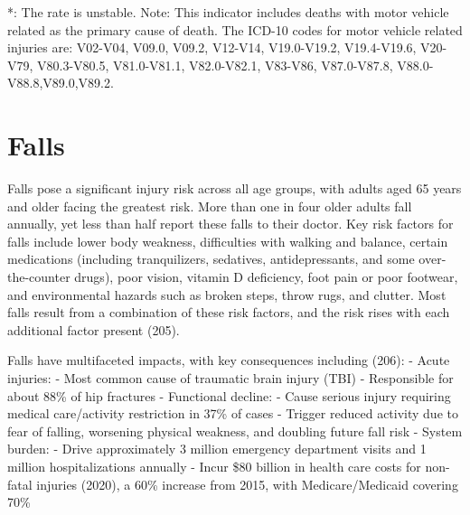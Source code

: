 \documentclass[
  english,
  letterpaper,
]{report}
\begin{document}
\begin{tcolorbox}[enhanced jigsaw, breakable, leftrule=.75mm, title=\textcolor{quarto-callout-note-color}{\faInfo}\hspace{0.5em}{Note}, bottomrule=.15mm, opacityback=0, left=2mm, colback=white, bottomtitle=1mm, coltitle=black, colbacktitle=quarto-callout-note-color!10!white, colframe=quarto-callout-note-color-frame, opacitybacktitle=0.6, toptitle=1mm, titlerule=0mm, arc=.35mm, rightrule=.15mm, toprule=.15mm]

*: The rate is unstable. Note: This indicator includes deaths with motor
vehicle related as the primary cause of death. The ICD-10 codes for
motor vehicle related injuries are: V02-V04, V09.0, V09.2, V12-V14,
V19.0-V19.2, V19.4-V19.6, V20-V79, V80.3-V80.5, V81.0-V81.1,
V82.0-V82.1, V83-V86, V87.0-V87.8, V88.0-V88.8,V89.0,V89.2.

\end{tcolorbox}

\section{Falls}\label{falls}

Falls pose a significant injury risk across all age groups, with adults
aged 65 years and older facing the greatest risk. More than one in four
older adults fall annually, yet less than half report these falls to
their doctor. Key risk factors for falls include lower body weakness,
difficulties with walking and balance, certain medications (including
tranquilizers, sedatives, antidepressants, and some over-the-counter
drugs), poor vision, vitamin D deficiency, foot pain or poor footwear,
and environmental hazards such as broken steps, throw rugs, and clutter.
Most falls result from a combination of these risk factors, and the risk
rises with each additional factor present (205).

Falls have multifaceted impacts, with key consequences including (206):
- Acute injuries: - Most common cause of traumatic brain injury (TBI) -
Responsible for about 88\% of hip fractures - Functional decline: -
Cause serious injury requiring medical care/activity restriction in 37\%
of cases - Trigger reduced activity due to fear of falling, worsening
physical weakness, and doubling future fall risk - System burden: -
Drive approximately 3 million emergency department visits and 1 million
hospitalizations annually - Incur \$80 billion in health care costs for
non-fatal injuries (2020), a 60\% increase from 2015, with
Medicare/Medicaid covering 70\%
\end{document}
